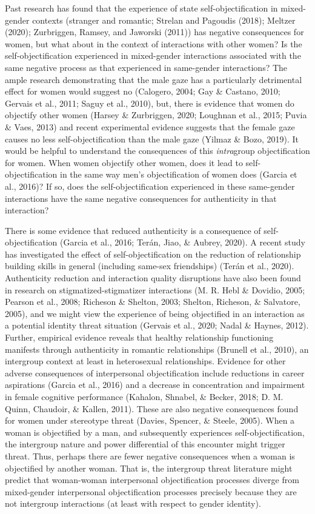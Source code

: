 \documentclass[man]{apa6}
\begin{document}
Past research has found that the experience of state
self-objectification in mixed-gender contexts (stranger and romantic;
Strelan and Pagoudis (2018); Meltzer (2020); Zurbriggen, Ramsey, and
Jaworski (2011)) has negative consequences for women, but what about in
the context of interactions with other women? Is the
self-objectification experienced in mixed-gender interactions associated
with the same negative process as that experienced in same-gender
interactions? The ample research demonstrating that the male gaze has a
particularly detrimental effect for women would suggest no (Calogero,
2004; Gay \& Castano, 2010; Gervais et al., 2011; Saguy et al., 2010),
but, there is evidence that women do objectify other women (Harsey \&
Zurbriggen, 2020; Loughnan et al., 2015; Puvia \& Vaes, 2013) and recent
experimental evidence suggests that the female gaze causes no less
self-objectification than the male gaze (Yilmaz \& Bozo, 2019). It would
be helpful to understand the consequences of this \emph{intra}group
objectification for women. When women objectify other women, does it
lead to self-objectification in the same way men's objectification of
women does (Garcia et al., 2016)? If so, does the self-objectification
experienced in these same-gender interactions have the same negative
consequences for authenticity in that interaction?

There is some evidence that reduced authenticity is a consequence of
self-objectification (Garcia et al., 2016; Terán, Jiao, \& Aubrey,
2020). A recent study has investigated the effect of
self-objectification on the reduction of relationship building skills in
general (including same-sex friendships) (Terán et al., 2020).
Authenticity reduction and interaction quality disruptions have also
been found in research on stigmatized-stigmatizer interactions (M. R.
Hebl \& Dovidio, 2005; Pearson et al., 2008; Richeson \& Shelton, 2003;
Shelton, Richeson, \& Salvatore, 2005), and we might view the experience
of being objectified in an interaction as a potential identity threat
situation (Gervais et al., 2020; Nadal \& Haynes, 2012). Further,
empirical evidence reveals that healthy relationship functioning
manifests through authenticity in romantic relationships (Brunell et
al., 2010), an intergroup context at least in heterosexual
relationships. Evidence for other adverse consequences of interpersonal
objectification include reductions in career aspirations (Garcia et al.,
2016) and a decrease in concentration and impairment in female cognitive
performance (Kahalon, Shnabel, \& Becker, 2018; D. M. Quinn, Chaudoir,
\& Kallen, 2011). These are also negative consequences found for women
under stereotype threat (Davies, Spencer, \& Steele, 2005). When a woman
is objectified by a man, and subsequently experiences
self-objectification, the intergroup nature and power differential of
this encounter might trigger threat. Thus, perhaps there are fewer
negative consequences when a woman is objectified by another woman. That
is, the intergroup threat literature might predict that woman-woman
interpersonal objectification processes diverge from mixed-gender
interpersonal objectification processes precisely because they are not
intergroup interactions (at least with respect to gender identity).
\end{document}
